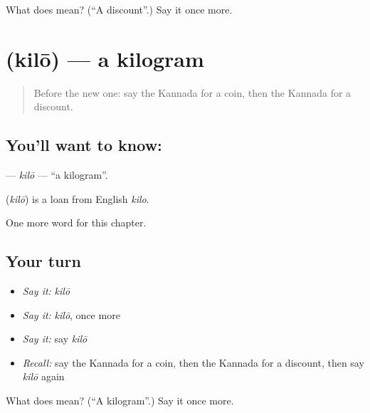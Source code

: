 \begin{tcolorbox}[breakable,colback=teal!4,colframe=teal!35!black,title={Before you move on}]
What does  mean? (\textquotedblleft{}A discount\textquotedblright{}.) Say it once more.
\end{tcolorbox}
\section[\texorpdfstring{\kn{ಕಿಲೋ} (kilō)}{ಕಿಲೋ (kilō)}]{ (kilō) — a kilogram}

\label{lesson:KA-C185-kilo}



\begin{quote}
Before the new one: say the Kannada for a coin, then the Kannada for a discount.
\end{quote}

\subsection*{You'll want to know: }
\textbf{} — \emph{kilō} — \textquotedblleft{}a kilogram\textquotedblright{}.

\begin{cousinweb}
\textbf{} (\emph{kilō}) is a loan from English \emph{kilo}.
\end{cousinweb}

\begin{grammarlens}[title={What you've built}]
One more word for this chapter.
\end{grammarlens}

\subsection*{Your turn}
\begin{itemize}
\raggedright
  \item \emph{Say it:} \emph{kilō}
  \item \emph{Say it:} \emph{kilō}, once more
  \item \emph{Say it:} say \emph{kilō}
  \item \emph{Recall:} say the Kannada for a coin, then the Kannada for a discount, then say \emph{kilō} again
\end{itemize}

\begin{tcolorbox}[breakable,colback=teal!4,colframe=teal!35!black,title={Before you move on}]
What does  mean? (\textquotedblleft{}A kilogram\textquotedblright{}.) Say it once more.
\end{tcolorbox}
